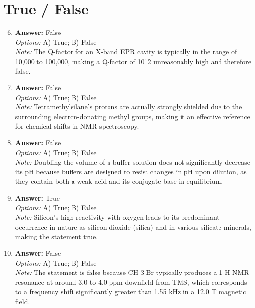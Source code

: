 \documentclass[12pt]{article}
\begin{document}
\section*{True / False}
\begin{enumerate}[label=\arabic*.]
\setcounter{enumi}{5}
\item \textbf{Answer:} False
\\ \textit{Options:} A) True; B) False
\\ \textit{Note:} The Q-factor for an X-band EPR cavity is typically in the range of 10,000 to 100,000, making a Q-factor of 1012 unreasonably high and therefore false.
\item \textbf{Answer:} False
\\ \textit{Options:} A) True; B) False
\\ \textit{Note:} Tetramethylsilane's protons are actually strongly shielded due to the surrounding electron-donating methyl groups, making it an effective reference for chemical shifts in NMR spectroscopy.
\item \textbf{Answer:} False
\\ \textit{Options:} A) True; B) False
\\ \textit{Note:} Doubling the volume of a buffer solution does not significantly decrease its pH because buffers are designed to resist changes in pH upon dilution, as they contain both a weak acid and its conjugate base in equilibrium.
\item \textbf{Answer:} True
\\ \textit{Options:} A) True; B) False
\\ \textit{Note:} Silicon's high reactivity with oxygen leads to its predominant occurrence in nature as silicon dioxide (silica) and in various silicate minerals, making the statement true.
\item \textbf{Answer:} False
\\ \textit{Options:} A) True; B) False
\\ \textit{Note:} The statement is false because CH 3 Br typically produces a 1 H NMR resonance at around 3.0 to 4.0 ppm downfield from TMS, which corresponds to a frequency shift significantly greater than 1.55 kHz in a 12.0 T magnetic field.
\end{enumerate}
\end{document}
